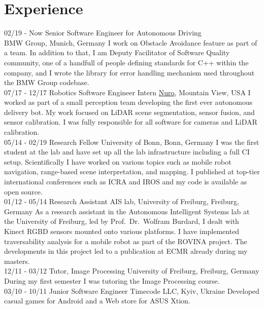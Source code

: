 \documentclass[]{friggeri-cv}
\begin{document}
\section{Experience}
\begin{entrylist}
  \entry
    {02/19 - Now}
    {Senior Software Engineer for Autonomous Driving\\}
    {BMW Group, Munich, Germany}
    {I work on Obstacle Avoidance feature as part of a team. In addition to that, I am Deputy Facilitator of Software Quality community, one of a handfull of people defining standards for C++ within the company, and I wrote the library for error handling mechanism used throughout the BMW Group codebase.\\}
  \entry
    {07/17 - 12/17}
    {Robotics Software Engineer Intern}
    {\href{https://nuro.ai/}{Nuro}, Mountain View, USA}
    {I worked as part of a small perception team developing the first ever autonomous delivery bot. My work focused on LiDAR scene segmentation, sensor fusion, and sensor calibration. I was fully responsible for all software for cameras and LiDAR calibration.\\}
  \entry
    {05/14 - 02/19}
    {Research Fellow}
    {University of Bonn, Bonn, Germany}
    {I was the first student at the lab and have set up all the lab infrastructure including a full CI setup. Scientifically I have worked on various topics such as mobile robot navigation, range-based scene interpretation, and mapping. I published at top-tier international conferences such as ICRA and IROS and my code is available as open source.\\}
  \entry
    {01/12 - 05/14}
    {Research Assistant}
    {AIS lab, University of Freiburg, Freiburg, Germany}
    {As a research assistant in the Autonomous Intelligent Systems lab at the University of Freiburg, led by Prof.~Dr.~Wolfram Burdard, I dealt with Kinect RGBD sensors mounted onto various platforms. I have implemented traversability analysis for a mobile robot as part of the ROVINA project. The developments in this project led to a publication at ECMR already during my masters.\\}
  \entry
    {12/11 - 03/12}
    {Tutor, Image Processing}
    {University of Freiburg, Freiburg, Germany}
    {During my first semester I was tutoring the Image Processing course.\\}
  \entry
    {03/10 - 10/11}
    {Junior Software Engineer}
    {Timecode LLC, Kyiv, Ukraine}
    {Developed casual games for Android and a Web store for ASUS Xtion.}
\end{entrylist}
\end{document}
